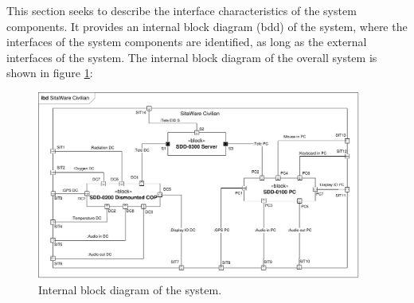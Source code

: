 This section seeks to describe the interface characteristics of the system components. It provides an internal block diagram (bdd) of the system, where the interfaces of the system components are identified, as long as the external interfaces of the system. The internal block diagram of the overall system is shown in figure \ref{fig:internal_block_diagram}:
\begin{figure}[H]
\centering
\includegraphics[width=0.95\textwidth]
{billeder/ibd_overordnet.pdf}
\caption{Internal block diagram of the system.}
\label{fig:internal_block_diagram}
\end{figure}


